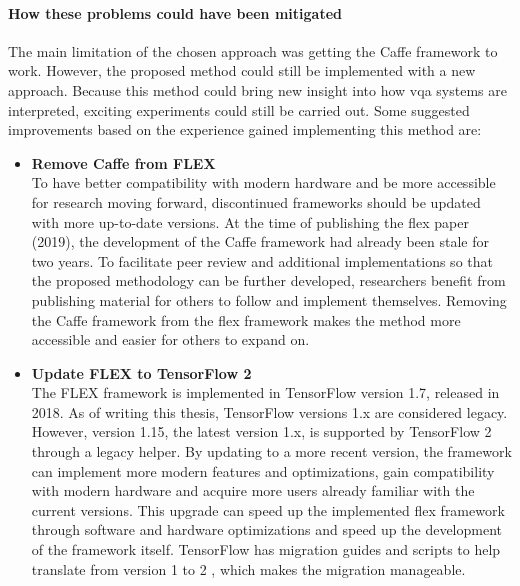             \paragraph{How these problems could have been mitigated\\}

            The main limitation of the chosen approach was getting the Caffe framework to work. However, the proposed method could still be implemented with a new approach. 
            Because this method could bring new insight into how \gls{vqa} systems are interpreted, exciting experiments could still be carried out.
            Some suggested improvements based on the experience gained implementing this method are:

            \begin{itemize}
                \item \textbf{Remove Caffe from FLEX\\} 
                To have better compatibility with modern hardware and be more accessible for research moving forward, discontinued frameworks should be updated with more up-to-date versions. At the time of publishing the \gls{flex} paper (2019), the development of the Caffe framework had already been stale for two years. To facilitate peer review and additional implementations so that the proposed methodology can be further developed, researchers benefit from publishing material for others to follow and implement themselves. 
                Removing the Caffe framework from the \gls{flex} framework makes the method more accessible and easier for others to expand on.

                \item \textbf{Update FLEX to TensorFlow 2\\}
                The FLEX framework is implemented in TensorFlow version 1.7, released in 2018. As of writing this thesis, TensorFlow versions 1.x are considered legacy. However, version 1.15, the latest version 1.x, is supported by TensorFlow 2 through a legacy helper. By updating to a more recent version, the framework can implement more modern features and optimizations, gain compatibility with modern hardware and acquire more users already familiar with the current versions. This upgrade can speed up the implemented \gls{flex} framework through software and hardware optimizations and speed up the development of the framework itself. 
                TensorFlow has migration guides and scripts to help translate from version 1 to 2 \cite{MigrateTensorFlowTensorFlow}, which makes the migration manageable. 
    


\end{itemize}

